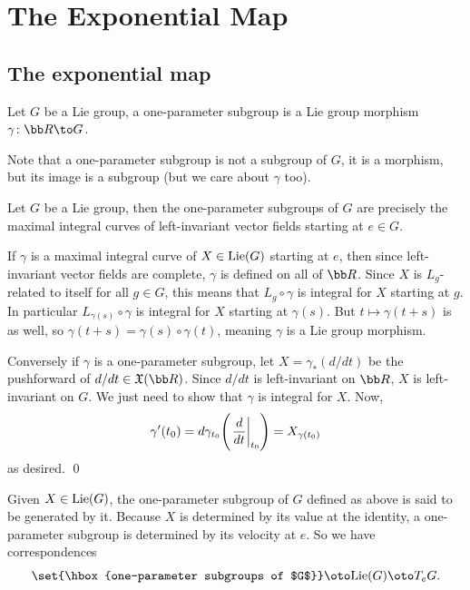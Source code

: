 \section{The Exponential Map}

\subsection{The exponential map}

\bdefn

    Let $G$ be a Lie group, a {\emphcolor one-parameter subgroup} is a Lie group morphism $\gamma\colon\bR\to G$.

\edefn

Note that a one-parameter subgroup is not a subgroup of $G$, it is a morphism, but its image is a subgroup (but we care about $\gamma$ too).

\bthrm

    Let $G$ be a Lie group, then the one-parameter subgroups of $G$ are precisely the maximal integral curves of left-invariant vector fields
    starting at $e\in G$.

\ethrm

\bproof

    If $\gamma$ is a maximal integral curve of $X\in{\rm Lie}(G)$ starting at $e$, then since left-invariant vector fields are complete,
    $\gamma$ is defined on all of $\bR$.
    Since $X$ is $L_g$-related to itself for all $g\in G$, this means that $L_g\circ\gamma$ is integral for $X$ starting at $g$.
    In particular $L_{\gamma(s)}\circ\gamma$ is integral for $X$ starting at $\gamma(s)$.
    But $t\mapsto\gamma(t+s)$ is as well, so $\gamma(t+s)=\gamma(s)\circ\gamma(t)$, meaning $\gamma$ is a Lie group morphism.

    Conversely if $\gamma$ is a one-parameter subgroup, let $X=\gamma_*(d/dt)$ be the pushforward of $d/dt\in\X(\bR)$.
    Since $d/dt$ is left-invariant on $\bR$, $X$ is left-invariant on $G$.
    We just need to show that $\gamma$ is integral for $X$.
    Now,
    $$ \gamma'(t_0) = d\gamma_{t_0}\mathopen{}\mathclose{\left(\left.{{d}\over{dt}}\right|_{t_0}\right)} = X_{\gamma(t_0)} $$
    as desired.
    \qed

\eproof

Given $X\in{\rm Lie}(G)$, the one-parameter subgroup of $G$ defined as above is said to be {\emphcolor generated} by it.
Because $X$ is determined by its value at the identity, a one-parameter subgroup is determined by its velocity at $e$.
So we have correspondences
$$ \set{\hbox{one-parameter subgroups of $G$}} \oto \lie(G) \oto T_eG . $$

